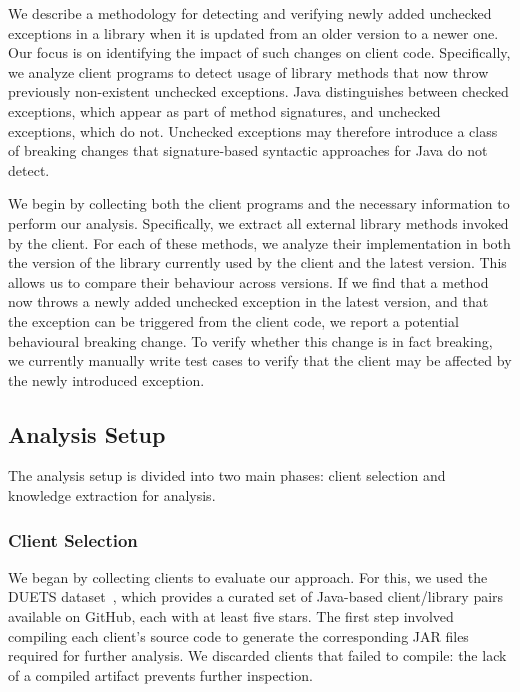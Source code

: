 We describe a methodology for detecting and verifying newly added unchecked exceptions in a library when it is updated from an older version to a newer one. Our focus is on identifying the impact of such changes on client code. Specifically, we analyze client programs to detect usage of library methods that now throw previously non-existent unchecked exceptions. Java distinguishes between checked exceptions, which appear as part of method signatures, and unchecked exceptions, which do not. Unchecked exceptions may therefore introduce a class of breaking changes that signature-based syntactic approaches for Java do not detect.

We begin by collecting both the client programs and the necessary information to perform our analysis. Specifically, we extract all external library methods invoked by the client. For each of these methods, we analyze their implementation in both the version of the library currently used by the client and the latest version. This allows us to compare their behaviour across versions. If we find that a method now throws a newly added unchecked exception in the latest version, and that the exception can be triggered from the client code, we report a potential behavioural breaking change. To verify whether this change is in fact breaking, we currently manually write test cases to verify that the client may be affected by the newly introduced exception.

\subsection{Analysis Setup}

The analysis setup is divided into two main phases: client selection and knowledge extraction for analysis.

\subsubsection{Client Selection}

We began by collecting clients to evaluate our approach. For this, we used the DUETS dataset~\cite{durieux21:_duets}, which provides a curated set of Java-based client/library pairs available on GitHub, each with at least five stars. The first step involved compiling each client's source code to generate the corresponding JAR files required for further analysis.  We discarded clients that failed to compile: the lack of a compiled artifact prevents further inspection.

